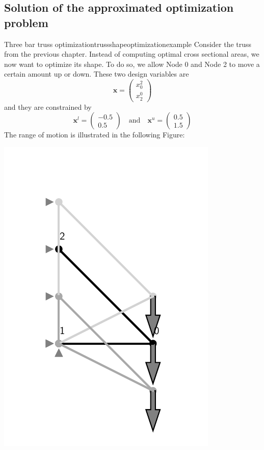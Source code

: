 \subsection{Solution of the approximated optimization problem}

\begin{example}{Three bar truss optimization}{trussshapeoptimizationexample}
    Consider the truss from the previous chapter. Instead of computing optimal cross sectional areas, we now want to optimize its shape. To do so, we allow Node 0 and Node 2 to move a certain amount up or down. These two design variables are 
    \begin{equation}
        \mathbf{x} = 
        \begin{pmatrix}
            x_0^2 \\ x_2^0
        \end{pmatrix}
    \end{equation}
    and they are constrained by 
    \begin{equation}
        \mathbf{x}^l = 
        \begin{pmatrix}
             -0.5\\ 0.5
        \end{pmatrix} 
        \quad 
        \text{and}
        \quad
        \mathbf{x}^u = 
        \begin{pmatrix}
             0.5\\ 1.5
        \end{pmatrix} 
    \end{equation}
    The range of motion is illustrated in the following Figure:
    \begin{center}
        \includegraphics[width=0.5\linewidth]{figures/three_bar_truss_shapes.pdf}
    \end{center}


\end{example}
